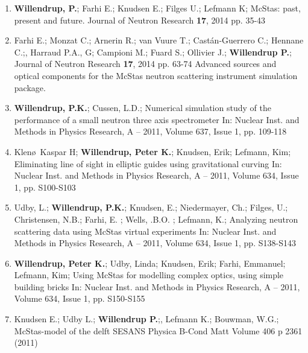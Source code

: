 \begin{enumerate}
\item {\bf Willendrup, P.}; Farhi E.; Knudsen E.; Filges U.; Lefmann
  K; McStas: past, present and future. Journal of Neutron Research
  {\bf 17}, 2014 pp. 35-43
\item Farhi E.; Monzat C.; Arnerin R.; van Vuure  T.; Castán-Guerrero
  C.; Hennane C.;, Harraud P.A., G; Campioni M.; Fuard S.; Ollivier
  J.; {\bf Willendrup P.}; Journal of Neutron Research
  {\bf 17}, 2014 pp. 63-74
Advanced sources and optical components for the McStas neutron scattering instrument simulation package.
  \item {\bf Willendrup, P.K.}; Cussen, L.D.; Numerical simulation study of
    the performance of a small neutron three axis spectrometer In:
    Nuclear Inst. and Methods in Physics Research, A -- 2011, Volume 637,
    Issue 1, pp. 109-118
  \item Klen\o\, Kaspar H; {\bf Willendrup, Peter K.}; Knudsen, Erik; Lefmann, Kim; Eliminating line of sight in elliptic guides using gravitational curving In: Nuclear Inst. and Methods in Physics Research, A -- 2011, Volume 634, Issue 1, pp. S100-S103
  \item Udby, L.; {\bf Willendrup, P.K.}; Knudsen, E.; Niedermayer, Ch.; Filges, U.; Christensen, N.B.; Farhi, E. ; Wells, .B.O. ; Lefmann, K.; Analyzing neutron scattering data using McStas virtual experiments In: Nuclear Inst. and Methods in Physics Research, A -- 2011, Volume 634, Issue 1, pp. S138-S143
  \item {\bf Willendrup, Peter K.}; Udby, Linda; Knudsen, Erik; Farhi, Emmanuel; Lefmann, Kim; Using McStas for modelling complex optics, using simple building bricks In: Nuclear Inst. and Methods in Physics Research, A -- 2011, Volume 634, Issue 1, pp. S150-S155
  \item Knudsen E.; Udby L.; {\bf Willendrup P.};, Lefmann K.; Bouwman, W.G.; McStas-model of the delft SESANS Physica B-Cond Matt Volume 406 p 2361 (2011)
  

\end{enumerate}
